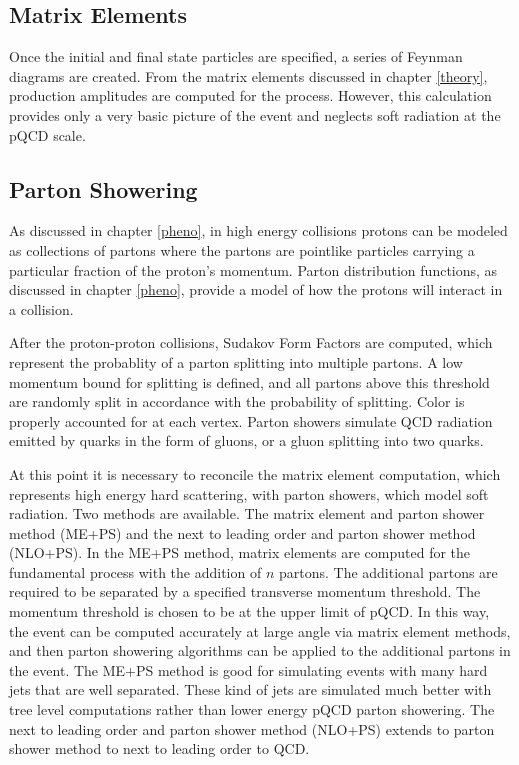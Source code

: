 \documentclass[oneside, letterpaper, oldfontcommands]{memoir}
\begin{document}
\subsection{Matrix Elements}\label{matrix}

\qquad  Once the initial and final state particles are specified, a series of Feynman diagrams are created. From the matrix elements discussed in chapter \ref{theory}, production amplitudes are computed for the process.
However, this calculation provides only a very basic picture of the event and neglects soft radiation at the pQCD scale. 
\subsection{Parton Showering}\label{partonshower}
\qquad As discussed in chapter \ref{pheno}, in high energy collisions protons can be modeled as collections of partons where the partons are pointlike particles carrying a particular fraction of the proton's momentum. Parton distribution functions, as discussed in chapter \ref{pheno}, provide a model of how the protons will interact in a collision. 

\qquad After the proton-proton collisions, Sudakov Form Factors\cite{Agashe:2014kda} are computed, which represent the probablity of a parton splitting into multiple partons. A low momentum bound for splitting is defined, and all partons above this threshold are randomly split in accordance with the probability of splitting. Color is properly accounted for at each vertex. Parton showers simulate QCD radiation emitted by quarks in the form of gluons, or a gluon splitting into two quarks.

\qquad At this point it is necessary to reconcile the matrix element computation, which represents high energy hard scattering, with parton showers, which model soft radiation. Two methods are available. The matrix element and parton shower method (ME+PS) and the next to leading order and parton shower method (NLO+PS)\cite{Agashe:2014kda}. In the ME+PS method, matrix elements are computed for the fundamental process with the addition of $n$ partons. The additional partons are required to be separated by a specified transverse momentum threshold. The momentum threshold is chosen to be at the upper limit of pQCD. In this way, the event can be computed accurately at large angle via matrix element methods, and then parton showering algorithms can be applied to the additional partons in the event. The ME+PS method is good for simulating events with many hard jets that are well separated. These kind of jets are simulated much better with tree level computations rather than lower energy pQCD parton showering. The next to leading order and parton shower method (NLO+PS) extends to parton shower method to next to leading order to QCD. 
\end{document}
